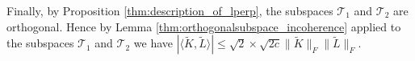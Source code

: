 Finally, by Proposition \ref{thm:description_of_lperp}, the subspaces $\mathcal{T}_1$ and $\mathcal{T}_2$ are orthogonal.  Hence by Lemma \ref{thm:orthogonalsubspace_incoherence} applied to the subspaces $\mathcal{T}_1$ and $\mathcal{T}_2$ we have $| \langle \tilde{K}, \tilde{L} \rangle | \leq \sqrt{2} \times \sqrt{2c} \|\tilde{K}\|_F \|\tilde{L}\|_F$.
%
%
\medskip 

